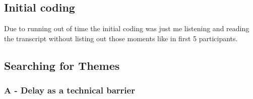  
    

\subsection{Initial coding}

Due to running out of time the initial coding was just me listening and reading the transcript without listing out those moments like in first 5 participants. 
         


\subsection{Searching for Themes}

\subsubsection{A - Delay as a technical barrier}

